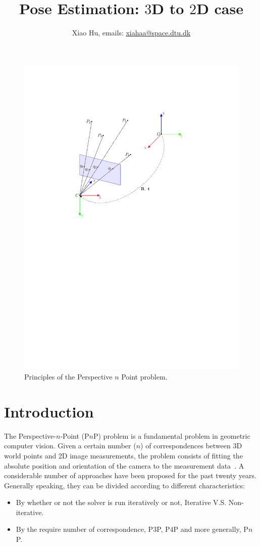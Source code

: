 \documentclass[a4paper]{article}
\begin{document}
\title{Pose Estimation: $3$D to $2$D case}
\author{Xiao Hu, emails: \url{xiahaa@space.dtu.dk}}
\maketitle
\begin{figure}
\centering
\includegraphics[scale=0.8]{hand_eye_files/vision/figures/pnp.pdf}
\caption{Principles of the Perspective $n$ Point problem.}
\end{figure}
\section{Introduction}
The Perspective-$n$-Point (P$n$P) problem is a fundamental problem in geometric computer vision. Given a certain number ($n$) of correspondences between 3D world points and 2D image measurements, the problem consists of fitting the absolute position and orientation of the camera to the measurement data~\cite{fischler1981random}. A considerable number of approaches have been proposed for the past twenty years. Generally speaking, they can be divided according to different characteristics:
\begin{itemize}
\item By whether or not the solver is run iteratively or not, Iterative V.S. Non-iterative.
\item By the require number of correspondence, P$3$P, P$4$P and more generally, P$n$P.
\end{itemize}
\end{document}

